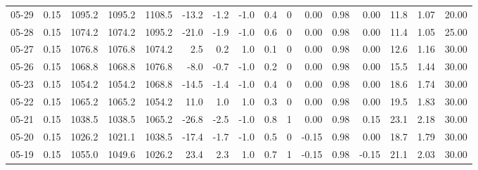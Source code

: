 \begin{threeparttable}
{\begin{tabular}{lrrrrrrrrrrrrrrr}
  05-29 &     0.15 & 1095.2 & 1095.2 & 1108.5 &      -13.2 &           -1.2 &                     -1.0 &                 0.4 &              0 &       0.00 &      0.98 &           0.00 &             11.8 &            1.07 &                  20.00 \\
  05-28 &     0.15 & 1074.2 & 1074.2 & 1095.2 &      -21.0 &           -1.9 &                     -1.0 &                 0.6 &              0 &       0.00 &      0.98 &           0.00 &             11.4 &            1.05 &                  25.00 \\
  05-27 &     0.15 & 1076.8 & 1076.8 & 1074.2 &        2.5 &            0.2 &                      1.0 &                 0.1 &              0 &       0.00 &      0.98 &           0.00 &             12.6 &            1.16 &                  30.00 \\
  05-26 &     0.15 & 1068.8 & 1068.8 & 1076.8 &       -8.0 &           -0.7 &                     -1.0 &                 0.2 &              0 &       0.00 &      0.98 &           0.00 &             15.5 &            1.44 &                  30.00 \\
  05-23 &     0.15 & 1054.2 & 1054.2 & 1068.8 &      -14.5 &           -1.4 &                     -1.0 &                 0.4 &              0 &       0.00 &      0.98 &           0.00 &             18.6 &            1.74 &                  30.00 \\
  05-22 &     0.15 & 1065.2 & 1065.2 & 1054.2 &       11.0 &            1.0 &                      1.0 &                 0.3 &              0 &       0.00 &      0.98 &           0.00 &             19.5 &            1.83 &                  30.00 \\
  05-21 &     0.15 & 1038.5 & 1038.5 & 1065.2 &      -26.8 &           -2.5 &                     -1.0 &                 0.8 &              1 &       0.00 &      0.98 &           0.15 &             23.1 &            2.18 &                  30.00 \\
  05-20 &     0.15 & 1026.2 & 1021.1 & 1038.5 &      -17.4 &           -1.7 &                     -1.0 &                 0.5 &              0 &      -0.15 &      0.98 &           0.00 &             18.7 &            1.79 &                  30.00 \\
  05-19 &     0.15 & 1055.0 & 1049.6 & 1026.2 &       23.4 &            2.3 &                      1.0 &                 0.7 &              1 &      -0.15 &      0.98 &          -0.15 &             21.1 &            2.03 &                  30.00 \\

\end{tabular}}
\end{threeparttable}
